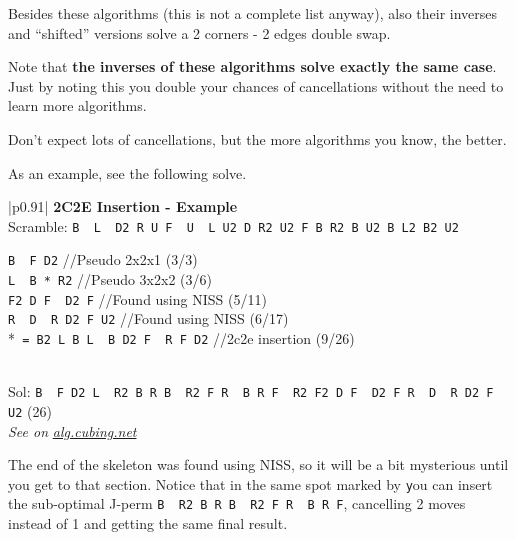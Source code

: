 \documentclass[11pt,a4paper]{book}
\newcommand{\p}{\textquotesingle}
\newcommand{\m}{\texttt}
\newcommand{\ps}{\p\,\,}
\newcommand{\comment}[1]{{\color{gray}\quad//#1}}
\begin{document}
Besides these algorithms (this is not a complete list anyway), also their inverses and ``shifted'' versions solve a 2 corners - 2 edges double swap.

Note that \textbf{the inverses of these algorithms solve exactly the same case}. Just by noting this you double your chances of cancellations without the need to learn more algorithms.

Don't expect lots of cancellations, but the more algorithms you know, the better.

As an example, see the following solve.

\bigskip
\begin{tabular}{|p{}|}
\hline
\textbf{2C2E Insertion - Example}\\
\hline
Scramble: \m{B\ps L\ps D2 R U F\ps U\ps L U2 D R2 U2 F B R2 B U2 B L2 B2 U2}\\
\hline
\begin{minipage}[l]{0.650\textwidth}
\m{B\ps F D2} \comment{Pseudo 2x2x1 (3/3)}\\
\m{L\ps B * R2} \comment{Pseudo 3x2x2 (3/6)}\\
\m{F2 D F\ps D2 F} \comment{Found using NISS (5/11)}\\
\m{R\ps D\ps R D2 F U2} \comment{Found using NISS (6/17)}\\
*\m{ = B2 L B L\ps B D2 F\ps R F D2} \comment{2c2e insertion (9/26)}
\end{minipage}
\begin{minipage}[c]{0.25\textwidth}

\end{minipage}\\
\hline
Sol: \m{B\ps F D2 L\ps R2 B R B\ps R2 F R\ps B R F\ps R2 F2 D F\ps D2 F R\ps D\ps R D2 F U2} (26)\\
\hline
\emph{See on }\href{https://alg.cubing.net/?setup=B-_L-_D2_R_U_F-_U-_L_U2_D_R2_U2_F_B_R2_B_U2_B_L2_B2_U2&alg=B-_F_D2_\%2F\%2FPseudo_2x2x1_(3\%2F3)\%0AL-_B_(B2_L_B_L-_B_D2_F-_R_F_D2)_R2_\%2F\%2FPseudo_3x2x2_(3\%2F6)\%0AF2_D_F-_D2_F_\%2F\%2FFound_using_NISS_(5\%2F11)\%0AR-_D-_R_D2_F_U2_\%2F\%2FFound_using_NISS_(6\%2F17)}{\emph{alg.cubing.net}}\\
\hline
\end{tabular}
\bigskip

The end of the skeleton was found using NISS, so it will be a bit mysterious until you get to that section. Notice that in the same spot marked by \m * you can insert the sub-optimal J-perm \m{B\ps R2 B R B\ps R2 F R\ps B R F\p}, cancelling 2 moves instead of 1 and getting the same final result.
\end{document}
